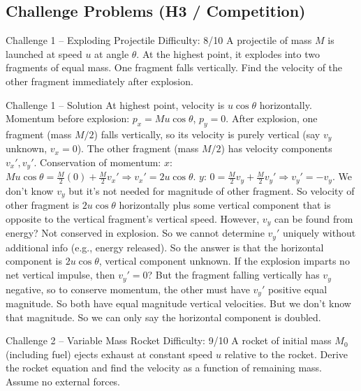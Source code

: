\documentclass[11pt]{beamer}
\begin{document}
\subsection{Challenge Problems (H3 / Competition)}

\begin{frame}[shrink=15]{Challenge 1 – Exploding Projectile \hfill Difficulty: 8/10}
A projectile of mass $M$ is launched at speed $u$ at angle $\theta$. At the highest point, it explodes into two fragments of equal mass. One fragment falls vertically. Find the velocity of the other fragment immediately after explosion.
\end{frame}

\begin{frame}[shrink=10]{Challenge 1 – Solution}
At highest point, velocity is $u\cos\theta$ horizontally. Momentum before explosion: $p_x = M u\cos\theta$, $p_y = 0$.
After explosion, one fragment (mass $M/2$) falls vertically, so its velocity is purely vertical (say $v_y$ unknown, $v_x=0$). The other fragment (mass $M/2$) has velocity components $v_x', v_y'$.
Conservation of momentum:
$x$: $M u\cos\theta = \frac{M}{2} (0) + \frac{M}{2} v_x' \Rightarrow v_x' = 2u\cos\theta$.
$y$: $0 = \frac{M}{2} v_y + \frac{M}{2} v_y' \Rightarrow v_y' = -v_y$.
We don't know $v_y$ but it's not needed for magnitude of other fragment. So velocity of other fragment is $2u\cos\theta$ horizontally plus some vertical component that is opposite to the vertical fragment's vertical speed. However, $v_y$ can be found from energy? Not conserved in explosion. So we cannot determine $v_y'$ uniquely without additional info (e.g., energy released). So the answer is that the horizontal component is $2u\cos\theta$, vertical component unknown. If the explosion imparts no net vertical impulse, then $v_y'=0$? But the fragment falling vertically has $v_y$ negative, so to conserve momentum, the other must have $v_y'$ positive equal magnitude. So both have equal magnitude vertical velocities. But we don't know that magnitude. So we can only say the horizontal component is doubled.
\end{frame}

\begin{frame}[shrink=15]{Challenge 2 – Variable Mass Rocket \hfill Difficulty: 9/10}
A rocket of initial mass $M_0$ (including fuel) ejects exhaust at constant speed $u$ relative to the rocket. Derive the rocket equation and find the velocity as a function of remaining mass. Assume no external forces.
\end{frame}
\end{document}
